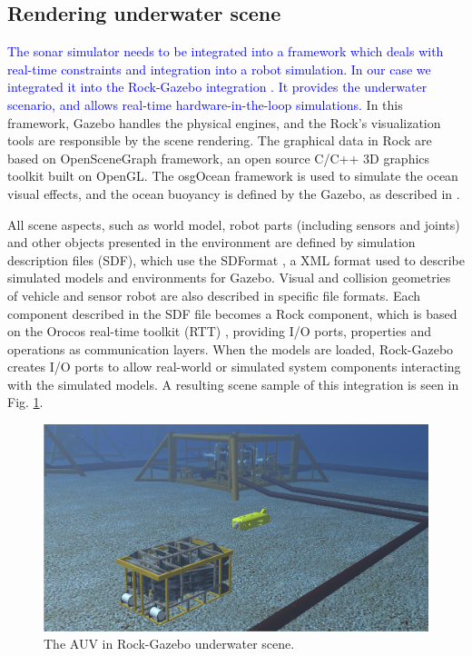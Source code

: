\documentclass[final,5p,times]{elsarticle}
\begin{document}

\subsection{Rendering underwater scene}
\label{dev:uwscene}

\textcolor{blue}{The sonar simulator needs to be integrated into a framework which
deals with real-time constraints and integration into a robot simulation. In our case we
integrated it into the Rock-Gazebo integration \cite{watanabe2015}. It provides the underwater
scenario, and allows real-time hardware-in-the-loop simulations.} In this
framework, Gazebo handles the physical engines, and the Rock's visualization
tools are responsible by the scene rendering. The graphical data in Rock are
based on OpenSceneGraph framework, an open source C/C++ 3D graphics toolkit
built on OpenGL. The osgOcean framework is used to simulate the ocean visual
effects, and the ocean buoyancy is defined by the Gazebo, as described
in \cite{watanabe2015}.

All scene aspects, such as world model, robot parts (including sensors and
joints) and other objects presented in the environment are defined by simulation
description files (SDF), which use the SDFormat \cite{sdformat2017}, a XML
format used to describe simulated models and environments for Gazebo. Visual
and collision geometries of vehicle and sensor robot are also described in
specific file formats. Each component described in the SDF file becomes a
Rock component, which is based on the Orocos real-time toolkit (RTT)
\cite{soetens2005}, providing I/O ports, properties and operations as
communication layers. When the models are loaded, Rock-Gazebo creates I/O
ports to allow real-world or simulated system components interacting with the
simulated models. A resulting scene sample of this integration is seen
in Fig. \ref{fig:uwscene}.

\begin{figure}[t]
    \includegraphics[width=\columnwidth]{figs/uwscene}
    \centering
    \captionsetup{justification=centering}
    \caption{The AUV in Rock-Gazebo underwater scene.}
    \label{fig:uwscene}
\end{figure}
\end{document}
